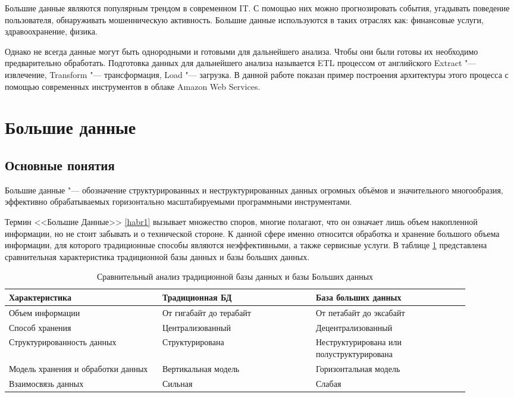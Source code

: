 \documentclass[bachelor, och, pract]{SCWorks}
\begin{document}
Большие данные являются популярным трендом в современном IT. С помощью них можно прогнозировать события, угадывать поведение пользователя, обнаруживать мошенническую активность. Большие данные используются в таких отраслях как: финансовые услуги, здравоохранение, физика.

Однако не всегда данные могут быть однородными и готовыми для дальнейшего анализа. Чтобы они были готовы их необходимо предварительно обработать. Подготовка данных для дальнейшего анализа называется  ETL процессом от английского Extract "--- извлечение, Transform "--- трансформация, Load "--- загрузка. В данной работе показан пример построения архитектуры этого процесса с помощью современных инструментов в облаке Amazon Web Services.

\section{Большие данные}

\subsection{Основные понятия}

Большие данные "--- обозначение структурированных и неструктурированных данных огромных объёмов и значительного многообразия, эффективно обрабатываемых горизонтально масштабируемыми программными инструментами.

Термин <<Большие Данные>> \ref{habr1}  вызывает множество споров, многие полагают, что он означает лишь объем накопленной информации, но не стоит забывать и о технической стороне. К данной сфере именно относится обработка и хранение  большого объема информации, для которого традиционные способы являются неэффективными, а также сервисные услуги. В таблице \ref{tab1} представлена сравнительная характеристика традиционной базы данных и базы больших данных.

\begin{table}[h!]
	\caption{Сравнительный анализ традиционной базы данных и базы Больших данных}
	\label{tab1}
	\begin{center}
		\begin{tabular}{|p{0.3\linewidth}|p{0.3\linewidth}|p{0.3\linewidth}|}
			\hline
			Характеристика & Традиционная БД &База больших данных \\
			\hline
			Объем информации & От гигабайт до терабайт & От петабайт до эксабайт\\
			\hline
			Способ хранения & Централизованный& Децентрализованный \\
			\hline
			Структурированность данных & Структурирована & Неструктурирована или полуструктурирована \\
			\hline
			Модель хранения и обработки данных & Вертикальная модель & Горизонтальная модель \\
			\hline
			Взаимосвязь данных & Сильная & Слабая \\
			\hline
		\end{tabular}
	\end{center}
\end{table}
\end{document}
